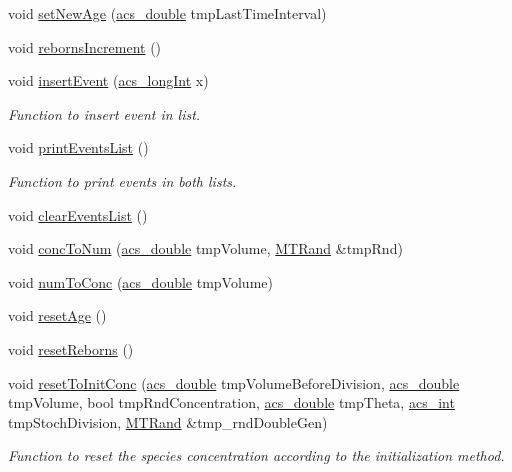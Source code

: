 \begin{DoxyCompactItemize}
\item 
void \hyperlink{a00022_aa73ab15fb28aefd3b0c6b19e7c9bb944}{set\-New\-Age} (\hyperlink{a00024_ab776853a005fcbf56af0424a2a4dd607}{acs\-\_\-double} tmp\-Last\-Time\-Interval)
\item 
void \hyperlink{a00022_a90d5fc1d90637f2245e8b0ecf228ddfa}{reborns\-Increment} ()
\item 
void \hyperlink{a00022_ad79b25968e6afcbe37624bebd46b2609}{insert\-Event} (\hyperlink{a00024_a19319d75f02db4308bc5c0026d98cd85}{acs\-\_\-long\-Int} x)
\begin{DoxyCompactList}\small\item\em Function to insert event in list. \end{DoxyCompactList}\item 
void \hyperlink{a00022_adb9034fecf662567aec4418d41769543}{print\-Events\-List} ()
\begin{DoxyCompactList}\small\item\em Function to print events in both lists. \end{DoxyCompactList}\item 
void \hyperlink{a00022_a625274ee9a1b299cfdf0f84888b1353e}{clear\-Events\-List} ()
\item 
void \hyperlink{a00022_a5502b77cd470c01e32a9fb4b2971c23c}{conc\-To\-Num} (\hyperlink{a00024_ab776853a005fcbf56af0424a2a4dd607}{acs\-\_\-double} tmp\-Volume, \hyperlink{a00016}{M\-T\-Rand} \&tmp\-Rnd)
\item 
void \hyperlink{a00022_a23c19a53390142ba690d0f3db0520d05}{num\-To\-Conc} (\hyperlink{a00024_ab776853a005fcbf56af0424a2a4dd607}{acs\-\_\-double} tmp\-Volume)
\item 
void \hyperlink{a00022_a911d4db36e84690d19abb2902a734524}{reset\-Age} ()
\item 
void \hyperlink{a00022_a4884d8bce59ddb79e87e08f3ed16633f}{reset\-Reborns} ()
\item 
void \hyperlink{a00022_af42d71292b091f4e6cb2a57464242ab8}{reset\-To\-Init\-Conc} (\hyperlink{a00024_ab776853a005fcbf56af0424a2a4dd607}{acs\-\_\-double} tmp\-Volume\-Before\-Division, \hyperlink{a00024_ab776853a005fcbf56af0424a2a4dd607}{acs\-\_\-double} tmp\-Volume, bool tmp\-Rnd\-Concentration, \hyperlink{a00024_ab776853a005fcbf56af0424a2a4dd607}{acs\-\_\-double} tmp\-Theta, \hyperlink{a00024_a8d277355641a098190360234e2ebde35}{acs\-\_\-int} tmp\-Stoch\-Division, \hyperlink{a00016}{M\-T\-Rand} \&tmp\-\_\-rnd\-Double\-Gen)
\begin{DoxyCompactList}\small\item\em Function to reset the species concentration according to the initialization method. \end{DoxyCompactList}\item 

\end{DoxyCompactItemize}
